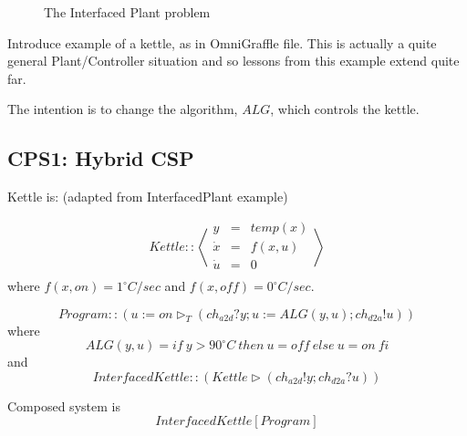 \documentclass[runningheads,a4paper]{llncs}
\begin{document}
\begin{figure}[hbt]
  \caption{The Interfaced Plant problem \cite{chaochen1996formal}}
  \label{fig:iPlant}
\end{figure}
\begin{example}

Introduce example of a kettle, as in OmniGraffle file. This is actually a quite general Plant/Controller situation and so lessons from this example extend quite far.

%
\end{example}

The intention is to change the algorithm, $ALG$, which controls the kettle.

\subsection{CPS1: Hybrid CSP}


Kettle is: (adapted from \cite{chaochen1996formal} InterfacedPlant example)

\[Kettle :: \left\langle 
\begin{array}{rcl}
 y&=&temp(x)\\
 \dot{x}&=&f(x,u)\\
 \dot{u}&=&0\\
\end{array}\right\rangle
\]
%
where $f(x,on) = 1^\circ C/sec$ and $f(x,off) = 0^\circ C/sec$.

\[Program :: (u := on\triangleright_T (ch_{a2d}?y; u := ALG(y,u); ch_{d2a}!u) )\]
where 
%
\[ALG(y,u) = if \ y > 90^\circ C \ then \ u = off \ else \ u = on \ fi\]
%
and
%
\[InterfacedKettle :: (Kettle \triangleright (ch_{a2d}!y ; ch_{d2a}?u) )\]

Composed system is 
\[InterfacedKettle[Program]\]
\end{document}
